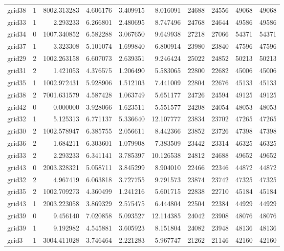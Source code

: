 \begin{longtable}{|l|r|r|r|r|r|r|r|r|r|}
grid38 & 1 & 8002.313283 & 4.606176 & 3.409915 & 8.016091 & 24688 & 24556 & 49068 & 49068 \\
grid33 & 1 & 2.293233 & 6.266801 & 2.480695 & 8.747496 & 24768 & 24644 & 49586 & 49586 \\
grid34 & 0 & 1007.340852 & 6.582288 & 3.067650 & 9.649938 & 27218 & 27066 & 54371 & 54371 \\
grid37 & 1 & 3.323308 & 5.101074 & 1.699840 & 6.800914 & 23980 & 23840 & 47596 & 47596 \\
grid29 & 2 & 1002.263158 & 6.607073 & 2.639351 & 9.246424 & 25022 & 24852 & 50213 & 50213 \\
grid31 & 2 & 1.421053 & 4.376575 & 1.206490 & 5.583065 & 22800 & 22682 & 45006 & 45006 \\
grid35 & 1 & 1002.972431 & 5.928906 & 1.512103 & 7.441009 & 22804 & 22676 & 45133 & 45133 \\
grid38 & 2 & 7001.631579 & 4.587428 & 1.063749 & 5.651177 & 24726 & 24594 & 49125 & 49125 \\
grid42 & 0 & 0.000000 & 3.928066 & 1.623511 & 5.551577 & 24208 & 24054 & 48053 & 48053 \\
grid32 & 1 & 5.125313 & 6.771137 & 5.336640 & 12.107777 & 23834 & 23702 & 47265 & 47265 \\
grid30 & 2 & 1002.578947 & 6.385755 & 2.056611 & 8.442366 & 23852 & 23726 & 47398 & 47398 \\
grid36 & 2 & 1.684211 & 6.303601 & 1.079908 & 7.383509 & 23442 & 23314 & 46325 & 46325 \\
grid33 & 2 & 2.293233 & 6.341141 & 3.785397 & 10.126538 & 24812 & 24688 & 49652 & 49652 \\
grid43 & 0 & 2003.328321 & 5.058711 & 3.845299 & 8.904010 & 22466 & 22346 & 44872 & 44872 \\
grid32 & 2 & 4.967419 & 6.063818 & 3.727755 & 9.791573 & 23874 & 23742 & 47325 & 47325 \\
grid35 & 2 & 1002.709273 & 4.360499 & 1.241216 & 5.601715 & 22838 & 22710 & 45184 & 45184 \\
grid43 & 1 & 2003.223058 & 3.869329 & 2.575475 & 6.444804 & 22504 & 22384 & 44929 & 44929 \\
grid39 & 0 & 9.456140 & 7.020858 & 5.093527 & 12.114385 & 24042 & 23908 & 48076 & 48076 \\
grid39 & 1 & 9.192982 & 4.545881 & 3.605923 & 8.151804 & 24082 & 23948 & 48136 & 48136 \\
grid3 & 1 & 3004.411028 & 3.746464 & 2.221283 & 5.967747 & 21262 & 21146 & 42160 & 42160 \\

\end{longtable}
